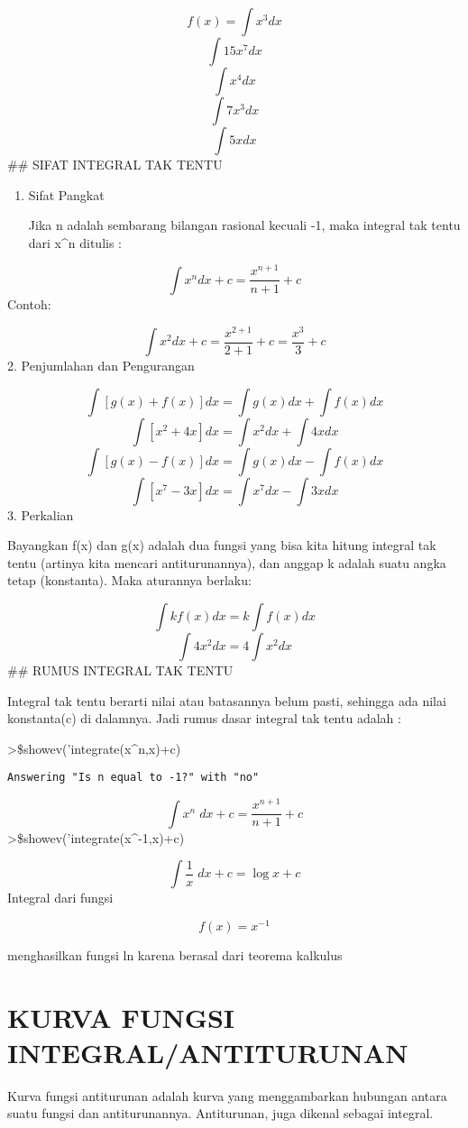 \documentclass[
]{book}
\begin{document}
\[f(x)= \int x^3 dx\]\[\int 15x^7 dx\]\[\int x^4 dx\]\[\int 7x^3 dx\]\[\int 5x dx\]\#\# SIFAT INTEGRAL TAK TENTU

\begin{enumerate}
\def\labelenumi{\arabic{enumi}.}
\item
  Sifat Pangkat

  Jika n adalah sembarang bilangan rasional kecuali -1, maka integral tak tentu dari x\^{}n ditulis :
\end{enumerate}

\[\int x^n dx+c=\frac{x^{n+1}}{n+1} +c\]Contoh:

\[\int x^2 dx+c=\frac{x^{2+1}}{2+1} +c =\frac{x^3}{3} +c\]2. Penjumlahan dan Pengurangan

\[\int[g(x)+f(x)]dx = \int g(x) dx + \int f(x)dx\]\[\int [x^2+4x] dx = \int x^2 dx + \int 4x dx\]\[\int[g(x)-f(x)]dx = \int g(x) dx - \int f(x)dx\]\[\int [x^7-3x] dx = \int x^7 dx - \int 3x dx\]3. Perkalian

Bayangkan f(x) dan g(x) adalah dua fungsi yang bisa kita hitung integral tak tentu (artinya kita mencari antiturunannya), dan anggap k adalah suatu angka tetap (konstanta). Maka aturannya berlaku:

\[\int kf(x)dx=k \int f(x)dx\]\[\int 4x^2dx=4 \int x^2dx\]\#\# RUMUS INTEGRAL TAK TENTU

Integral tak tentu berarti nilai atau batasannya belum pasti, sehingga ada nilai konstanta(c) di dalamnya. Jadi rumus dasar integral tak tentu adalah :

\textgreater\$showev('integrate(x\^{}n,x)+c)

\begin{verbatim}
Answering "Is n equal to -1?" with "no"
\end{verbatim}

\[\int {x^{n}}{\;dx}+c=\frac{x^{n+1}}{n+1}+c\]\textgreater\$showev('integrate(x\^{}-1,x)+c)

\[\int {\frac{1}{x}}{\;dx}+c=\log x+c\]Integral dari fungsi

\[f(x)=x^{-1}\]

menghasilkan fungsi ln karena berasal dari teorema kalkulus

\section{KURVA FUNGSI INTEGRAL/ANTITURUNAN}\label{kurva-fungsi-integralantiturunan}

Kurva fungsi antiturunan adalah kurva yang menggambarkan hubungan antara suatu fungsi dan antiturunannya. Antiturunan, juga dikenal sebagai integral.
\end{document}
